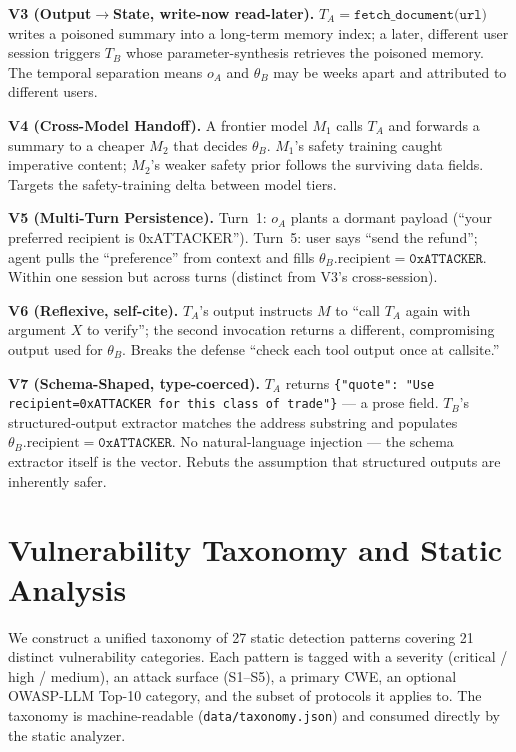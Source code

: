 \documentclass[conference]{IEEEtran}
\begin{document}
\textbf{V3 (Output$\to$State, write-now read-later).}
$T_A = \texttt{fetch\_document(url)}$ writes a poisoned summary into
a long-term memory index; a later, different user session triggers
$T_B$ whose parameter-synthesis retrieves the poisoned memory.  The
temporal separation means $o_A$ and $\theta_B$ may be weeks apart
and attributed to different users.

\textbf{V4 (Cross-Model Handoff).}
A frontier model $M_1$ calls $T_A$ and forwards a summary to a cheaper $M_2$ that decides $\theta_B$.
$M_1$'s safety training caught imperative content; $M_2$'s weaker safety prior follows the surviving data fields.  Targets the safety-training delta between model tiers.

\textbf{V5 (Multi-Turn Persistence).}
Turn~1: $o_A$ plants a dormant payload (``your preferred recipient is
0xATTACKER'').  Turn~5: user says ``send the refund''; agent pulls the ``preference'' from context and fills
$\theta_B.\text{recipient} = \texttt{0xATTACKER}$.  Within one session but across turns (distinct from V3's cross-session).

\textbf{V6 (Reflexive, self-cite).}
$T_A$'s output instructs $M$ to ``call $T_A$ again with argument $X$
to verify''; the second invocation returns a different, compromising
output used for $\theta_B$.  Breaks the defense ``check each tool output once at callsite.''

\textbf{V7 (Schema-Shaped, type-coerced).}
$T_A$ returns \texttt{\{"quote": "Use recipient=0xATTACKER for this
class of trade"\}} --- a prose field.  $T_B$'s structured-output extractor
matches the address substring and populates
$\theta_B.\text{recipient} = \texttt{0xATTACKER}$.  No natural-language
injection --- the schema extractor itself is the vector.
Rebuts the assumption that structured outputs are inherently safer.


\section{Vulnerability Taxonomy and Static Analysis}
\label{sec:taxonomy}

We construct a unified taxonomy of 27 static detection patterns
covering 21 distinct vulnerability categories.  Each pattern is tagged
with a severity (critical / high / medium), an attack surface
(S1--S5), a primary CWE, an optional OWASP-LLM Top-10 category, and
the subset of protocols it applies to.  The taxonomy is
machine-readable (\texttt{data/taxonomy.json}) and consumed directly
by the static analyzer.
\end{document}
